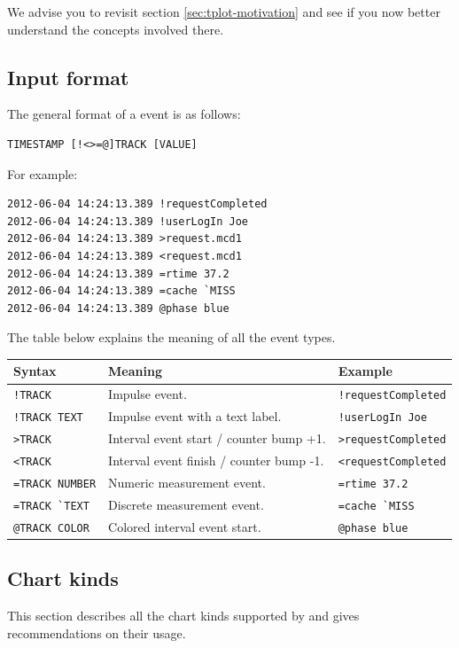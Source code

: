 \documentclass{article}
\begin{document}
We advise you to revisit section \ref{sec:tplot-motivation} and see if you now better understand the concepts involved there.

\pagebreak
\subsection{Input format}
\label{sec:tplot-input-format}

The general format of a \timeplot{} event is as follows:
\begin{verbatim}
TIMESTAMP [!<>=@]TRACK [VALUE]
\end{verbatim}

For example:
\begin{verbatim}
2012-06-04 14:24:13.389 !requestCompleted
2012-06-04 14:24:13.389 !userLogIn Joe
2012-06-04 14:24:13.389 >request.mcd1
2012-06-04 14:24:13.389 <request.mcd1
2012-06-04 14:24:13.389 =rtime 37.2
2012-06-04 14:24:13.389 =cache `MISS
2012-06-04 14:24:13.389 @phase blue
\end{verbatim}

The table below explains the meaning of all the event types.

\begin{tabular}{|l|p{200px}|l|}
\hline
Syntax & Meaning & Example \\
\hline
\verb|!TRACK| & Impulse event. & \verb|!requestCompleted| \\
\hline
\verb|!TRACK TEXT| & Impulse event with a text label. & \verb|!userLogIn Joe| \\
\hline
\verb|>TRACK| & Interval event start / counter bump +1. & \verb|>requestCompleted| \\
\hline
\verb|<TRACK| & Interval event finish / counter bump -1. & \verb|<requestCompleted| \\
\hline
\verb|=TRACK NUMBER| & Numeric measurement event. & \verb|=rtime 37.2| \\
\hline
\verb|=TRACK `TEXT| & Discrete measurement event. & \verb|=cache `MISS| \\
\hline
\verb|@TRACK COLOR| & Colored interval event start. & \verb|@phase blue| \\
\hline
\end{tabular}

\pagebreak
\subsection{Chart kinds}
\label{sec:tplot-chart-kinds}
This section describes all the chart kinds supported by \timeplot{} and gives recommendations on their usage.
\end{document}

